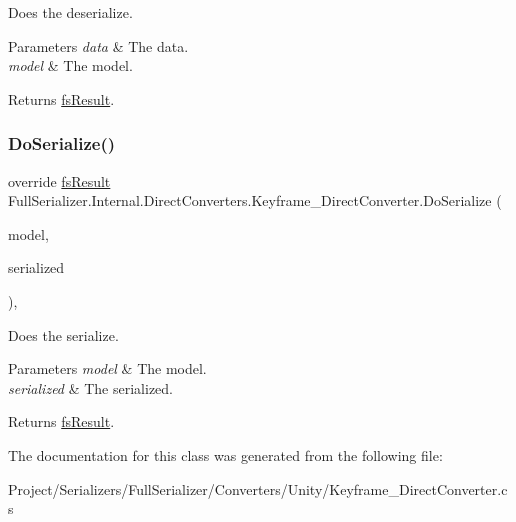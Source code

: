 Does the deserialize. 


\begin{DoxyParams}{Parameters}
{\em data} & The data.\\
\hline
{\em model} & The model.\\
\hline
\end{DoxyParams}
\begin{DoxyReturn}{Returns}
\hyperlink{struct_full_serializer_1_1fs_result}{fs\+Result}.
\end{DoxyReturn}
\mbox{\label{class_full_serializer_1_1_internal_1_1_direct_converters_1_1_keyframe___direct_converter_af16890a5241dfeb04a749245f64dd859}} 
\subsubsection{\texorpdfstring{Do\+Serialize()}{DoSerialize()}}
{\footnotesize\ttfamily override \hyperlink{struct_full_serializer_1_1fs_result}{fs\+Result} Full\+Serializer.\+Internal.\+Direct\+Converters.\+Keyframe\+\_\+\+Direct\+Converter.\+Do\+Serialize (\begin{DoxyParamCaption}\item[{Keyframe}]{model,  }\item[{Dictionary$<$ string, \hyperlink{class_full_serializer_1_1fs_data}{fs\+Data} $>$}]{serialized }\end{DoxyParamCaption})\hspace{0.3cm}{\ttfamily [inline]}, {\ttfamily [protected]}}



Does the serialize. 


\begin{DoxyParams}{Parameters}
{\em model} & The model.\\
\hline
{\em serialized} & The serialized.\\
\hline
\end{DoxyParams}
\begin{DoxyReturn}{Returns}
\hyperlink{struct_full_serializer_1_1fs_result}{fs\+Result}.
\end{DoxyReturn}


The documentation for this class was generated from the following file\+:\begin{DoxyCompactItemize}
\item 
Project/\+Serializers/\+Full\+Serializer/\+Converters/\+Unity/Keyframe\+\_\+\+Direct\+Converter.\+cs\end{DoxyCompactItemize}
